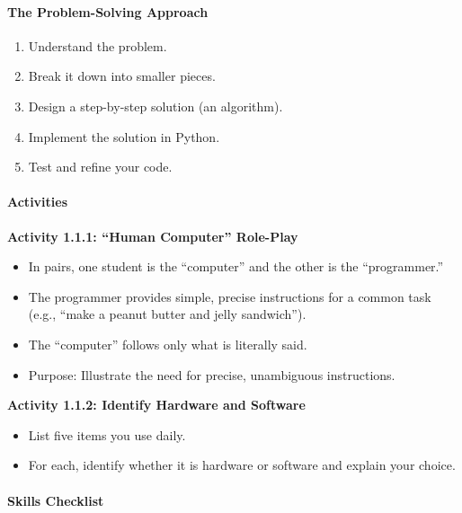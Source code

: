 \documentclass[
  justified,
  openright,
]{tufte-book}
\let\subsection\paragraph
\let\paragraph\paragraph
\let\subsection\paragraph
\let\paragraph\paragraph
\providecommand{\tightlist}{%
  \setlength{\itemsep}{0pt}\setlength{\parskip}{0pt}}
\begin{document}
\subsection{The Problem-Solving
Approach}\label{the-problem-solving-approach}

\begin{enumerate}
\def\labelenumi{\arabic{enumi}.}
\tightlist
\item
  Understand the problem.
\item
  Break it down into smaller pieces.
\item
  Design a step-by-step solution (an algorithm).
\item
  Implement the solution in Python.
\item
  Test and refine your code.
\end{enumerate}

\subsection{Activities}\label{activities}

\textbf{Activity 1.1.1: ``Human Computer'' Role-Play}

\begin{itemize}
\tightlist
\item
  In pairs, one student is the ``computer'' and the other is the
  ``programmer.''
\item
  The programmer provides simple, precise instructions for a common task
  (e.g., ``make a peanut butter and jelly sandwich'').
\item
  The ``computer'' follows only what is literally said.
\item
  Purpose: Illustrate the need for precise, unambiguous instructions.
\end{itemize}

\textbf{Activity 1.1.2: Identify Hardware and Software}

\begin{itemize}
\tightlist
\item
  List five items you use daily.
\item
  For each, identify whether it is hardware or software and explain your
  choice.
\end{itemize}

\subsection{Skills Checklist}\label{skills-checklist-4}
\end{document}
